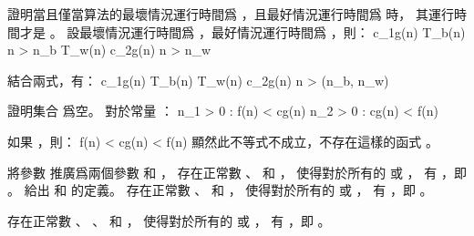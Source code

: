 \startEXERCISE
證明當且僅當算法的最壞情況運行時間爲 ，且最好情況運行時間爲  時，
其運行時間才是 。
\stopEXERCISE
\startANSWER
設最壞情況運行時間爲 ，最好情況運行時間爲 ，則：
\startformula\startalign
{} \leq c_1g(n) \leq T_b(n) \NC \quad {} n > n_b \NR
{} \leq T_w(n) \leq c_2g(n) \NC \quad {} n > n_w \NR
\stopalign\stopformula

結合兩式，有：
 \leq c_1g(n) \leq T_b(n) \leq T_w(n) \leq c_2g(n)
   \quad {} n > \max(n_b, n_w)
\stopformula
\stopANSWER

\startEXERCISE
證明集合  爲空。
\stopEXERCISE
\startANSWER
對於常量 ：
\startformula\startalign
\NC \exists n_1 > 0 :  \leq f(n) < cg(n) \NR
\NC \exists n_2 > 0 :  \leq cg(n) < f(n) \NR
\stopalign\stopformula

如果 ，則：
\startformula
f(n) < cg(n) < f(n)
\stopformula
顯然此不等式不成立，不存在這樣的函式 。
\stopANSWER

\startEXERCISE
將參數  推廣爲兩個參數  和 ，
存在正常數 、  和 ，
使得對於所有的  或 ，
有 ，即 。
給出  和  的定義。
\stopEXERCISE
\startANSWER
存在正常數 、  和 ，
使得對於所有的  或 ，
有 ，即 。

存在正常數 、 、  和 ，
使得對於所有的  或 ，
有 ，即 。
\stopANSWER

\stopsection
